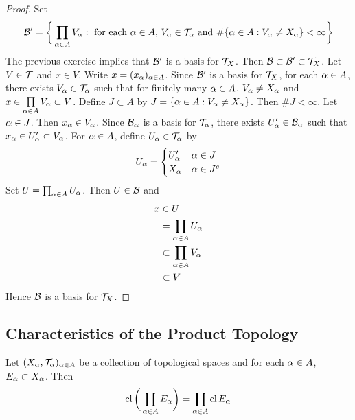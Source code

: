 \documentclass{book}
\begin{document}
	\begin{proof}
		Set 
		$$\mathcal{B}' = \bigg \{\prod_{\alpha \in A}V_{\alpha}: \text{ for each $\alpha \in A$,  $V_{\alpha} \in \mathcal{T}_{\alpha}$ and $\# \{\alpha \in A: V_{\alpha} \neq X_{\alpha}\} < \infty$} \bigg\}$$
		The previous exercise implies that $\mathcal{B}'$ is a basis for $\mathcal{T}_X$. Then $\mathcal{B} \subset \mathcal{B}' \subset \mathcal{T}_X$. Let $V \in \mathcal{T}$ and $x \in V$. Write $x = (x_{\alpha})_{\alpha \in A}$. Since $\mathcal{B}'$ is a basis for $\mathcal{T}_X$, for each $\alpha \in A$, there exists $V_{\alpha} \in \mathcal{T}_{\alpha}$ such that for finitely many $\alpha \in A$, $V_{\alpha} \neq X_{\alpha}$ and $x \in \prod\limits_{\alpha \in A} V_{\alpha} \subset V$. Define $J \subset A$ by $J = \{\alpha \in A: V_{\alpha} \neq X_{\alpha}\}$. Then $\#J < \infty$. Let $\alpha \in J$. Then $x_{\alpha} \in V_{\alpha}$. Since $\mathcal{B}_{\alpha}$ is a basis for $\mathcal{T}_{\alpha}$, there exists $U'_{\alpha} \in \mathcal{B}_{\alpha}$ such that $x_{\alpha} \in U'_{\alpha} \subset V_{\alpha}$. For $\alpha \in A$, define $U_{\alpha} \in \mathcal{T}_{\alpha}$ by 
		\[
		U_{\alpha} =
		\begin{cases}
			U'_{\alpha} & \alpha \in J \\
			X_{\alpha} & \alpha \in J^c
		\end{cases}
		\]
		Set $U = \prod_{\alpha \in A} U_{\alpha}$. Then $U \in \mathcal{B}$ and 
		\begin{align*}
			x 
			& \in U \\
			& = \prod_{\alpha \in A} U_{\alpha} \\
			& \subset \prod\limits_{\alpha \in A} V_{\alpha} \\
			& \subset V
		\end{align*}
		Hence $\mathcal{B}$ is a basis for $\mathcal{T}_X$.
	\end{proof}






























	\subsection{Characteristics of the Product Topology}

	\begin{ex}  
		Let $(X_{\alpha}, \mathcal{T}_{\alpha})_{\alpha \in A}$ be a collection of topological spaces and for each $\alpha \in A$, $E_{\alpha} \subset X_{\alpha}$. Then 
		$$\operatorname{cl} \bigg( \prod_{\alpha \in A} E_{\alpha} \bigg) = \prod_{\alpha \in A} \operatorname{cl} E_{\alpha}$$ 
		 
	\end{ex}
\end{document}
